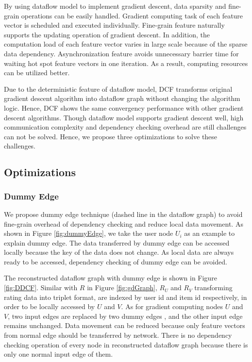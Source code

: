 \documentclass{llncs}
\begin{document}
By using dataflow model to implement gradient descent, data sparsity and fine-grain operations can be easily handled. Gradient computing task of each feature vector is scheduled and executed individually. Fine-grain feature naturally supports the updating operation of gradient descent. In addition, the computation load of each feature vector varies in large scale because of the sparse data dependency. Asynchronization feature avoids unnecessary barrier time for waiting hot spot feature vectors in one iteration. As a result, computing resources can be utilized better.

Due to the deterministic feature of dataflow model, DCF transforms original gradient descent algorithm into dataflow graph without changing the algorithm logic. Hence, DCF shows the same convergency performance with other gradient descent algorithms. Though dataflow model supports gradient descent well, high communication complexity and dependency checking overhead are still challenges can not be solved. Hence, we propose three optimizations to solve these challenges.

\vspace{-10pt}
\subsection{Optimizations}
\subsubsection{Dummy Edge}

We propose dummy edge technique (dashed line in the dataflow graph) to avoid fine-grain overhead of dependency checking and reduce local data movement. As shown in Figure \ref{fig:dummyEdge}, we take the user node $U_i$ as an example to explain dummy edge. The data transferred by dummy edge can be accessed locally because the key of the data does not change. As local data are always ready to be accessed, dependency checking of dummy edge can be avoided.

The reconstructed dataflow graph with dummy edge is shown in Figure \ref{fig:DDCF}. Similar with $R$ in Figure \ref{fig:gdGraph}, $R_U$ and $R_V$ transforming rating data into triplet format, are indexed by user id and item id respectively, in order to be locally accessed by $U$ and $V$. As for gradient computing nodes $U$ and $V$, two input edges are replaced by two dummy edges , and the other input edge remains unchanged. Data movement can be reduced because only feature vectors from normal edge
should be transferred by network.
There is no dependency checking operation of every node in reconstructed dataflow graph because there is only one normal input edge of them.
\vspace{-10pt}
\end{document}
